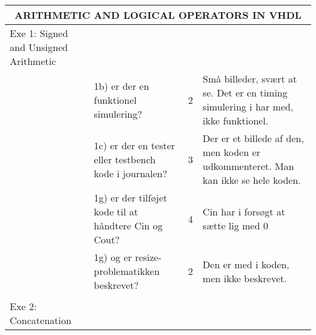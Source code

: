 \begin{table}[h]
    \small
    \begin{tabularx}{\textwidth}{p{3.5cm}Xp{5mm}X}

        \toprule
        \multicolumn{4}{c}{ARITHMETIC AND LOGICAL OPERATORS IN VHDL}                                                                                                                                                                                              \\\midrule
        Exe 1: Signed and Unsigned Arithmetic &                                                                                                     &   &                                                                                                         \\
                                              & 1b) er der en funktionel simulering?                                                                & 2 & Små billeder, svært at se. Det er en timing simulering i har med, ikke funktionel.                      \\
                                              & 1c) er der en tester eller testbench kode i journalen?                                              & 3 & Der er et billede af den, men koden er udkommenteret. Man kan ikke se hele koden.                                                            \\
                                              & 1g) er der tilføjet kode til at håndtere Cin og Cout?                                               & 4 & Cin har i forsøgt at sætte lig med 0                   \\
                                              & 1g) og er resize-problematikken beskrevet?                                                          & 2 & Den er med i koden, men ikke beskrevet.                                                 \\
                                              &                                                                                                     &   &                                                                                                         \\ \midrule
        Exe 2: Concatenation                  &                                                                                                     &   &                                                                                                         \\

\end{tabularx}
\end{table}
